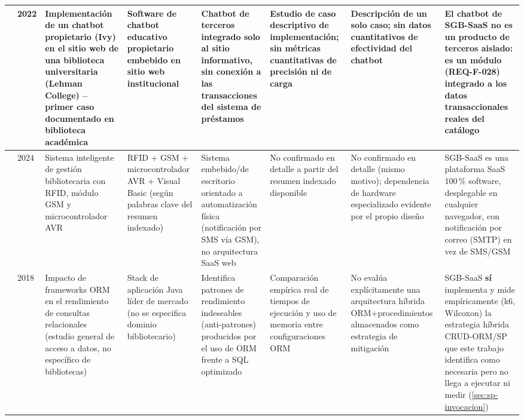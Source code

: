 \begin{landscape}
\begin{center}
\begin{longtable}{|p{2.0cm}|p{0.8cm}|p{2.5cm}|p{2.5cm}|p{2.8cm}|p{3.0cm}|p{2.8cm}|p{3.0cm}|}
\citet{ehrenpreis2022chatbot} & 2022 &
Implementación de un chatbot propietario (Ivy) en el sitio web de una
biblioteca universitaria (Lehman College) -- primer caso documentado en
biblioteca académica &
Software de chatbot educativo propietario embebido en sitio web
institucional &
Chatbot de terceros integrado solo al sitio informativo, sin conexión a
las transacciones del sistema de préstamos &
Estudio de caso descriptivo de implementación; sin métricas
cuantitativas de precisión ni de carga &
Descripción de un solo caso; sin datos cuantitativos de efectividad del
chatbot &
El chatbot de SGB-SaaS no es un producto de terceros aislado: es un
módulo (REQ-F-028) integrado a los datos transaccionales reales del
catálogo \\
\hline

\citet{shivaji2024intelligentlms} & 2024 &
Sistema inteligente de gestión bibliotecaria con RFID, módulo GSM y
microcontrolador AVR &
RFID + GSM + microcontrolador AVR + Visual Basic (según palabras clave
del resumen indexado) &
Sistema embebido/de escritorio orientado a automatización física
(notificación por SMS vía GSM), no arquitectura SaaS web &
No confirmado en detalle a partir del resumen indexado disponible &
No confirmado en detalle (mismo motivo); dependencia de hardware
especializado evidente por el propio diseño &
SGB-SaaS es una plataforma SaaS 100\,\% software, desplegable en
cualquier navegador, con notificación por correo (SMTP) en vez de
SMS/GSM \\
\hline

\citet{colley2018ormperformance} & 2018 &
Impacto de frameworks ORM en el rendimiento de consultas relacionales
(estudio general de acceso a datos, no específico de bibliotecas) &
Stack de aplicación Java líder de mercado (no se especifica dominio
bibliotecario) &
Identifica patrones de rendimiento indeseables (anti-patrones)
producidos por el uso de ORM frente a SQL optimizado &
Comparación empírica real de tiempos de ejecución y uso de memoria entre
configuraciones ORM &
No evalúa explícitamente una arquitectura híbrida ORM+\allowbreak procedimientos
almacenados como estrategia de mitigación &
SGB-SaaS \textbf{sí} implementa y mide empíricamente (k6, Wilcoxon) la
estrategia híbrida CRUD-ORM/SP que este trabajo identifica como
necesaria pero no llega a ejecutar ni medir (\autoref{sec:sp-invocacion}) \\
\hline


\end{longtable}
\end{center}
\end{landscape}
